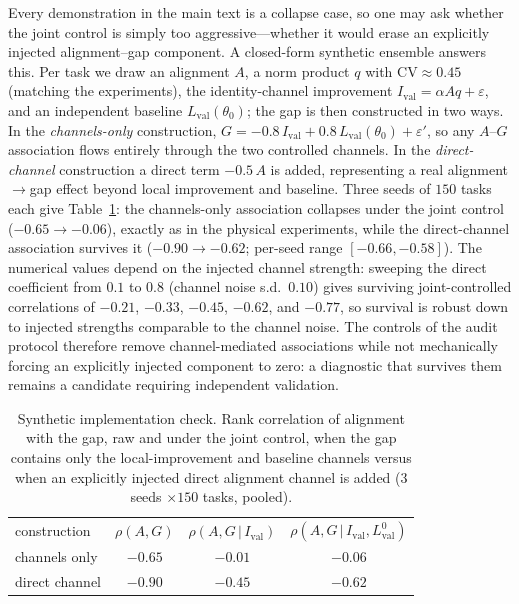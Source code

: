 \documentclass[aps,pra,onecolumn,superscriptaddress,10pt]{revtex4-2}
\newcommand{\CV}{\mathrm{CV}}
\newcommand{\Ival}{I_{\mathrm{val}}}
\newcommand{\thetaz}{\theta_0}
\newcommand{\Lval}{L_{\mathrm{val}}}
\begin{document}
Every demonstration in the main text is a collapse case, so one may ask whether the joint control is
simply too aggressive---whether it would erase an explicitly injected alignment--gap component.
A closed-form synthetic ensemble answers this. Per task we draw an alignment $A$, a norm product $q$
with $\CV\approx0.45$ (matching the experiments), the identity-channel improvement
$\Ival=\alpha A q+\varepsilon$, and an independent baseline $\Lval(\thetaz)$; the gap is then
constructed in two ways. In the \emph{channels-only} construction,
$G=-0.8\,\Ival+0.8\,\Lval(\thetaz)+\varepsilon'$, so any $A$--$G$ association flows entirely through
the two controlled channels. In the \emph{direct-channel} construction a direct term $-0.5\,A$ is
added, representing a real alignment$\to$gap effect beyond local improvement and baseline. Three
seeds of $150$ tasks each give Table~\ref{tab:positive}: the channels-only association collapses
under the joint control ($-0.65\to-0.06$), exactly as in the physical experiments, while the
direct-channel association survives it ($-0.90\to-0.62$; per-seed range $[-0.66,-0.58]$). The numerical values depend on the injected channel strength: sweeping the direct coefficient from
$0.1$ to $0.8$ (channel noise s.d.\ $0.10$) gives surviving joint-controlled correlations of $-0.21$,
$-0.33$, $-0.45$, $-0.62$, and $-0.77$, so survival is robust down to injected strengths comparable
to the channel noise. The
controls of the audit protocol therefore remove channel-mediated associations while not mechanically forcing an explicitly injected component to zero: a diagnostic that survives them remains a candidate requiring independent validation.

\begin{table}[h]
\caption{\label{tab:positive}%
Synthetic implementation check. Rank correlation of alignment with the gap, raw and under the joint
control, when the gap contains only the local-improvement and baseline channels versus when an explicitly injected direct alignment channel is added ($3$ seeds $\times150$ tasks, pooled).}
\begin{ruledtabular}
\begin{tabular}{lccc}
construction & $\rho(A,G)$ & $\rho(A,G\,|\,\Ival)$ & $\rho(A,G\,|\,\Ival,\Lval^{0})$ \\
\colrule
channels only    & $-0.65$ & $-0.01$ & $-0.06$ \\
direct channel   & $-0.90$ & $-0.45$ & $-0.62$ \\
\end{tabular}
\end{ruledtabular}
\end{table}
\end{document}
